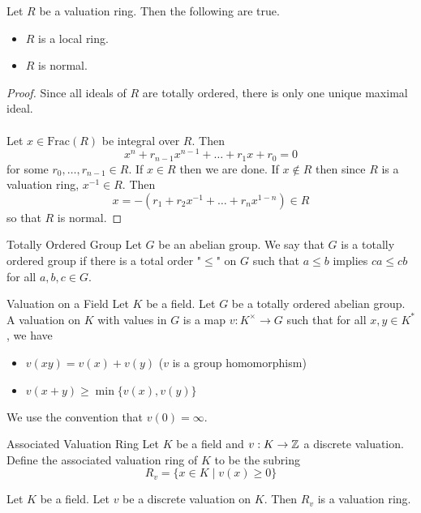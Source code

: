 \documentclass[a4paper]{article}
\begin{document}
\begin{lmm}{}{} Let $R$ be a valuation ring. Then the following are true. 
\begin{itemize}
\item $R$ is a local ring. 
\item $R$ is normal. 
\end{itemize} \tcbline
\begin{proof}
Since all ideals of $R$ are totally ordered, there is only one unique maximal ideal. \\~\\

Let $x\in\text{Frac}(R)$ be integral over $R$. Then $$x^n+r_{n-1}x^{n-1}+\dots+r_1x+r_0=0$$ for some $r_0,\dots,r_{n-1}\in R$. If $x\in R$ then we are done. If $x\notin R$ then since $R$ is a valuation ring, $x^{-1}\in R$. Then $$x=-(r_1+r_2x^{-1}+\dots+r_nx^{1-n})\in R$$ so that $R$ is normal. 
\end{proof}
\end{lmm}

\begin{defn}{Totally Ordered Group}{} Let $G$ be an abelian group. We say that $G$ is a totally ordered group if there is a total order "$\leq$" on $G$ such that $a\leq b$ implies $ca\leq cb$ for all $a,b,c\in G$. 
\end{defn}

\begin{defn}{Valuation on a Field}{} Let $K$ be a field. Let $G$ be a totally ordered abelian group. A valuation on $K$ with values in $G$ is a map $v:K^\times\to G$ such that for all $x,y\in K^\ast$, we have 
\begin{itemize}
\item $v(xy)=v(x)+v(y)$ ($v$ is a group homomorphism)
\item $v(x+y)\geq\min\{v(x),v(y)\}$
\end{itemize}
We use the convention that $v(0)=\infty$. 
\end{defn}

\begin{defn}{Associated Valuation Ring}{} Let $K$ be a field and $v:K\to\mathbb{Z}$ a discrete valuation. Define the associated valuation ring of $K$ to be the subring $$R_v=\{x\in K\;|\;v(x)\geq 0\}$$
\end{defn}

\begin{lmm}{}{} Let $K$ be a field. Let $v$ be a discrete valuation on $K$. Then $R_v$ is a valuation ring. 
\end{lmm}
\end{document}
